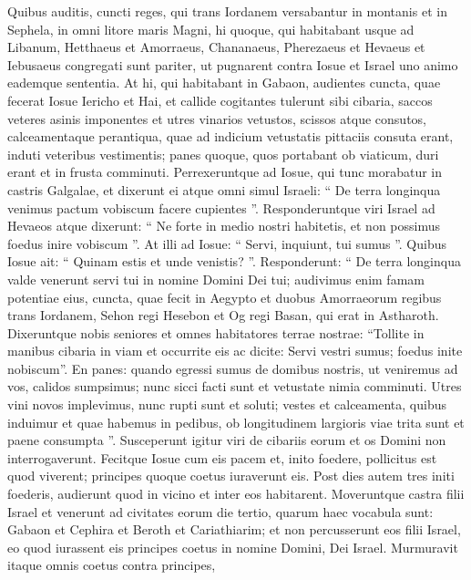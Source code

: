 \begin{biblechapter}
\begin{biblechapter}
\begin{biblechapter}
\begin{biblechapter}
\begin{biblechapter}
\begin{biblechapter}
\begin{biblechapter}
\begin{biblechapter}
\begin{biblechapter}
\verse Quibus auditis, cuncti reges, qui trans Iordanem versabantur in montanis et in Sephela, in omni litore maris Magni, hi quoque, qui habitabant usque ad Libanum, Hetthaeus et Amorraeus, Chananaeus, Pherezaeus et Hevaeus et Iebusaeus 
\verse congregati sunt pariter, ut pugnarent contra Iosue et Israel uno animo eademque sententia.
 \verse At hi, qui habitabant in Gabaon, audientes cuncta, quae fecerat Iosue Iericho et Hai, 
\verse et callide cogitantes tulerunt sibi cibaria, saccos veteres asinis imponentes et utres vinarios vetustos, scissos atque consutos, 
\verse calceamentaque perantiqua, quae ad indicium vetustatis pittaciis consuta erant, induti veteribus vestimentis; panes quoque, quos portabant ob viaticum, duri erant et in frusta comminuti. 
\verse Perrexeruntque ad Iosue, qui tunc morabatur in castris Galgalae, et dixerunt ei atque omni simul Israeli: “ De terra longinqua venimus pactum vobiscum facere cupientes ”. Responderuntque viri Israel ad Hevaeos atque dixerunt: 
\verse “ Ne forte in medio nostri habitetis, et non possimus foedus inire vobiscum ”. 
\verse At illi ad Iosue: “ Servi, inquiunt, tui sumus ”. Quibus Iosue ait: “ Quinam estis et unde venistis? ”. 
\verse Responderunt: “ De terra longinqua valde venerunt servi tui in nomine Domini Dei tui; audivimus enim famam potentiae eius, cuncta, quae fecit in Aegypto 
\verse et duobus Amorraeorum regibus trans Iordanem, Sehon regi Hesebon et Og regi Basan, qui erat in Astharoth. 
\verse Dixeruntque nobis seniores et omnes habitatores terrae nostrae: “Tollite in manibus cibaria in viam et occurrite eis ac dicite: Servi vestri sumus; foedus inite nobiscum”. 
\verse En panes: quando egressi sumus de domibus nostris, ut veniremus ad vos, calidos sumpsimus; nunc sicci facti sunt et vetustate nimia comminuti. 
\verse Utres vini novos implevimus, nunc rupti sunt et soluti; vestes et calceamenta, quibus induimur et quae habemus in pedibus, ob longitudinem largioris viae trita sunt et paene consumpta ”.
 \verse Susceperunt igitur viri de cibariis eorum et os Domini non interrogaverunt. 
\verse Fecitque Iosue cum eis pacem et, inito foedere, pollicitus est quod viverent; principes quoque coetus iuraverunt eis.
 \verse Post dies autem tres initi foederis, audierunt quod in vicino et inter eos habitarent. 
\verse Moveruntque castra filii Israel et venerunt ad civitates eorum die tertio, quarum haec vocabula sunt: Gabaon et Cephira et Beroth et Cariathiarim; 
\verse et non percusserunt eos filii Israel, eo quod iurassent eis principes coetus in nomine Domini, Dei Israel. Murmuravit itaque omnis coetus contra principes, 

\end{biblechapter}
\end{biblechapter}
\end{biblechapter}
\end{biblechapter}
\end{biblechapter}
\end{biblechapter}
\end{biblechapter}
\end{biblechapter}
\end{biblechapter}
